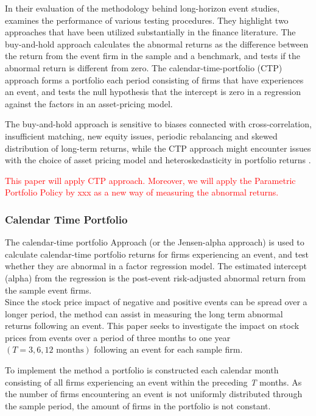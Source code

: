 In their evaluation of the methodology behind long-horizon event studies, \cite{Ang_event_method} examines the performance of various testing procedures. They highlight two approaches that have been utilized substantially in the finance literature. The buy-and-hold approach calculates the abnormal returns as the difference between the return from the event firm in the sample and a benchmark, and tests if the abnormal return is different from zero. The calendar-time-portfolio (CTP) approach forms a portfolio each period consisting of firms that have experiences an event, and tests the null hypothesis that the intercept is zero in a regression against the factors in an asset-pricing model.

The buy-and-hold approach is sensitive to biases connected with cross-correlation, insufficient matching, new equity issues, periodic rebalancing and skewed distribution of long-term returns, while the CTP approach might encounter issues with the choice of asset pricing model and heteroskedasticity in portfolio returns \citep{Ang_event_method}.  


\textcolor{red}{ This paper will apply CTP approach. Moreover, we will apply the Parametric Portfolio Policy by xxx as a new way of measuring the abnormal returns.} 

\subsubsection{Calendar Time Portfolio}

The calendar-time portfolio Approach (or the Jensen-alpha approach) is used to calculate calendar-time portfolio returns for firms experiencing an event, and test whether they are abnormal in a factor regression model. The estimated intercept (alpha) from the regression is the post-event risk-adjusted abnormal return from the sample event firms. \\
Since the stock price impact of negative and positive events can be spread over a longer period, the method can assist in measuring the long term abnormal returns following an event. This paper seeks to investigate the impact on stock prices from events over a period of three months to one year $(T = 3, 6, 12 \text{ months})$ following an event for each sample firm. 

To implement the method a portfolio is constructed each calendar month consisting of all firms experiencing an event within the preceding \textit{T} months. As the number of firms encountering an event is not uniformly distributed through the sample period, the amount of firms in the portfolio is not constant. 

